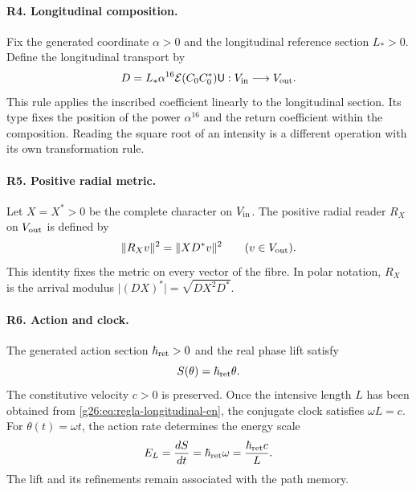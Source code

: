 \paragraph{R4. Longitudinal composition.}
Fix the generated coordinate \(\alpha>0\) and the longitudinal
reference section \(L_*>0\). Define the longitudinal transport by
\begin{equation}
 D=L_*\alpha^{16}\mathcal E(C_0C_0^*)\mathsf U:
 V_{\rm in}\longrightarrow V_{\rm out}.
 \label{g26:eq:regla-longitudinal-en}
\end{equation}
This rule applies the inscribed coefficient linearly to the longitudinal
section. Its type fixes the position of the power \(\alpha^{16}\)
and the return coefficient within the composition. Reading the square
root of an intensity is a different operation with its own transformation
rule.

\paragraph{R5. Positive radial metric.}
Let \(X=X^*>0\) be the complete character on \(V_{\rm in}\).
The positive radial reader \(R_X\) on \(V_{\rm out}\) is defined by
\begin{equation}
 \|R_Xv\|^2=\|XD^*v\|^2
 \qquad(v\in V_{\rm out}).
 \label{g26:eq:metrica-radial-en}
\end{equation}
This identity fixes the metric on every vector of the fibre. In polar
notation, \(R_X\) is the arrival modulus
\(\lvert(DX)^*\rvert=\sqrt{DX^2D^*}\).

\paragraph{R6. Action and clock.}
The generated action section \(\hbar_{\rm ret}>0\) and the real
phase lift satisfy
\begin{equation}
 S(\theta)=\hbar_{\rm ret}\theta.
 \label{g26:eq:accion-fase-en}
\end{equation}
The constitutive velocity \(c>0\) is preserved. Once the intensive
length \(L\) has been obtained from
\eqref{g26:eq:regla-longitudinal-en}, the conjugate clock satisfies
\(\omega L=c\). For \(\theta(t)=\omega t\), the action rate
determines the energy scale
\begin{equation}
 E_{L}=\frac{dS}{dt}=\hbar_{\rm ret}\omega
   =\frac{\hbar_{\rm ret}c}{L}.
 \label{g26:eq:escala-energetica-en}
\end{equation}
The lift and its refinements remain associated with the path memory.

